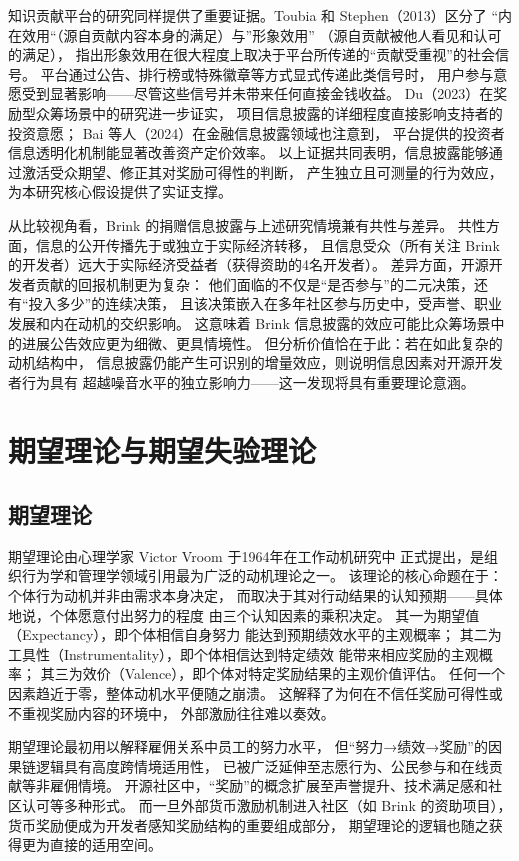 \documentclass[
    type = master, %
    degree = professional,        %
    decl-page,  %
    twoside,                %
    fontset = fandol %
  ]{njuthesis}
\begin{document}
知识贡献平台的研究同样提供了重要证据。Toubia 和 Stephen（2013）区分了
“内在效用“（源自贡献内容本身的满足）与”形象效用”
（源自贡献被他人看见和认可的满足），
指出形象效用在很大程度上取决于平台所传递的“贡献受重视”的社会信号\cite{toubia2013intrinsic}。
平台通过公告、排行榜或特殊徽章等方式显式传递此类信号时，
用户参与意愿受到显著影响——尽管这些信号并未带来任何直接金钱收益。
Du（2023）在奖励型众筹场景中的研究进一步证实，
项目信息披露的详细程度直接影响支持者的投资意愿\cite{du2023impact}；
Bai 等人（2024）在金融信息披露领域也注意到，
平台提供的投资者信息透明化机制能显著改善资产定价效率\cite{bai2024platform}。
以上证据共同表明，信息披露能够通过激活受众期望、修正其对奖励可得性的判断，
产生独立且可测量的行为效应，为本研究核心假设提供了实证支撑。

从比较视角看，Brink 的捐赠信息披露与上述研究情境兼有共性与差异。
共性方面，信息的公开传播先于或独立于实际经济转移，
且信息受众（所有关注 Brink 的开发者）远大于实际经济受益者（获得资助的4名开发者）。
差异方面，开源开发者贡献的回报机制更为复杂：
他们面临的不仅是“是否参与”的二元决策，还有“投入多少”的连续决策，
且该决策嵌入在多年社区参与历史中，受声誉、职业发展和内在动机的交织影响。
这意味着 Brink 信息披露的效应可能比众筹场景中的进展公告效应更为细微、更具情境性。
但分析价值恰在于此：若在如此复杂的动机结构中，
信息披露仍能产生可识别的增量效应，则说明信息因素对开源开发者行为具有
超越噪音水平的独立影响力——这一发现将具有重要理论意涵。

\section{期望理论与期望失验理论}

\subsection{期望理论}

期望理论由心理学家 Victor Vroom 于1964年在工作动机研究中
正式提出\cite{vroom1964work}，是组织行为学和管理学领域引用最为广泛的动机理论之一。
该理论的核心命题在于：个体行为动机并非由需求本身决定，
而取决于其对行动结果的认知预期——具体地说，个体愿意付出努力的程度
由三个认知因素的乘积决定。
其一为期望值（Expectancy），即个体相信自身努力
能达到预期绩效水平的主观概率；
其二为工具性（Instrumentality），即个体相信达到特定绩效
能带来相应奖励的主观概率；
其三为效价（Valence），即个体对特定奖励结果的主观价值评估。
任何一个因素趋近于零，整体动机水平便随之崩溃。
这解释了为何在不信任奖励可得性或不重视奖励内容的环境中，
外部激励往往难以奏效。

期望理论最初用以解释雇佣关系中员工的努力水平，
但“努力→绩效→奖励”的因果链逻辑具有高度跨情境适用性，
已被广泛延伸至志愿行为、公民参与和在线贡献等非雇佣情境。
开源社区中，“奖励”的概念扩展至声誉提升、技术满足感和社区认可等多种形式。
而一旦外部货币激励机制进入社区（如 Brink 的资助项目），
货币奖励便成为开发者感知奖励结构的重要组成部分，
期望理论的逻辑也随之获得更为直接的适用空间。
\end{document}
